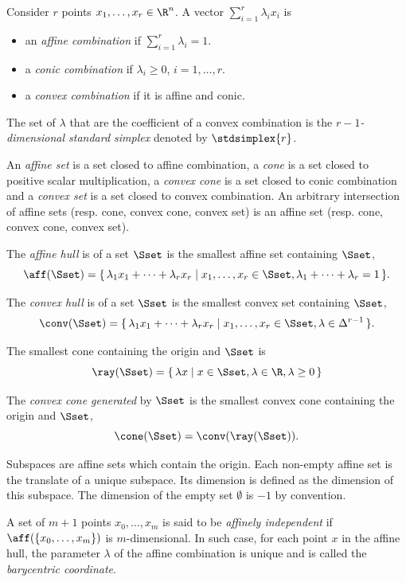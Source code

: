 \documentclass[11pt,twoside,a4paper,openright]{uclouvain-thesis}
\begin{document}
Consider $r$ points $x_1, \ldots, x_r \in \R^n$.
A vector $\sum_{i=1}^r \lambda_i x_i$ is
\begin{itemize}
  \item an \emph{affine combination} if $\sum_{i = 1}^r \lambda_i = 1$.
  \item a \emph{conic combination} if $\lambda_i \geq 0$, $i = 1, \ldots, r$.
  \item a \emph{convex combination} if it is affine and conic.
\end{itemize}
The set of $\lambda$ that are the coefficient of a convex combination is the \emph{$r-1$-dimensional standard simplex} denoted by $\stdsimplex{r}$.

An \emph{affine set} is a set closed to affine combination, a \emph{cone} is a set closed to positive scalar multiplication, a \emph{convex cone} is a set closed to conic combination and a \emph{convex set} is a set closed to convex combination.
An arbitrary intersection of affine sets (resp. cone, convex cone, convex set) is an affine set (resp. cone, convex cone, convex set).

The \emph{affine hull} is of a set $\Sset$ is the smallest affine set containing $\Sset$,
\[ \aff(\Sset) = \{\, \lambda_1 x_1 + \cdots + \lambda_r x_r \mid x_1, \ldots, x_r \in \Sset, \lambda_1 + \cdots + \lambda_r = 1 \,\}. \]

The \emph{convex hull} is of a set $\Sset$ is the smallest convex set containing $\Sset$,
\[ \conv(\Sset) = \{\, \lambda_1 x_1 + \cdots + \lambda_r x_r \mid x_1, \ldots, x_r \in \Sset, \lambda \in \Delta^{r-1} \,\}. \]

The smallest cone containing the origin and $\Sset$ is %
\[ \ray(\Sset) = \{\, \lambda x \mid x \in \Sset, \lambda \in \R, \lambda \geq 0 \,\} \]

The \emph{convex cone generated} by $\Sset$ is the smallest convex cone containing the origin and $\Sset$,
\[ \cone(\Sset) = \conv(\ray(\Sset)). \]

Subspaces are affine sets which contain the origin.
Each non-empty affine set is the translate of a unique subspace. %
Its dimension is defined as the dimension of this subspace.
The dimension of the empty set $\emptyset$ is $-1$ by convention.

A set of $m+1$ points $x_0, \ldots, x_m$ is said to be \emph{affinely independent} if $\aff(\{x_0, \ldots, x_m\})$ is $m$-dimensional.
In such case, for each point $x$ in the affine hull, the parameter $\lambda$ of the affine combination is unique and is called the \emph{barycentric coordinate}.
\end{document}
